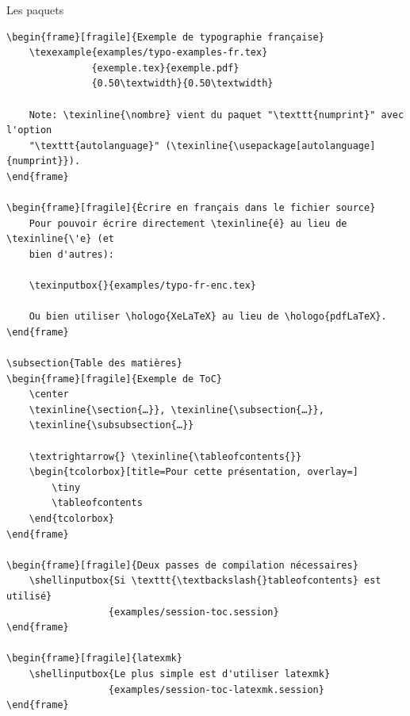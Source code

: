 \documentclass[usenames,dvipsnames]{beamer} %
\newcommand{\texinputbox}[2]{
    \begin{tcolorbox}[title=#1]
        \selectlanguage{english}
        \texinput{#2}
    \end{tcolorbox}
}
\newcommand{\shellinputbox}[2]{
    \begin{tcolorbox}[title=#1,overlay=]
        \selectlanguage{english}
        \shellinput{#2}
    \end{tcolorbox}
}
\newcommand{\texexample}[5]{
    \begin{columns}
        \begin{column}{#4}
            \texinputbox{#2}{#1}
        \end{column}

        \begin{column}{#5}
            \begin{tcolorbox}[title=#3, overlay=]
                
            \end{tcolorbox}
        \end{column}
    \end{columns}
}
\begin{document}
\begin{frame}[fragile]{Les paquets}
\begin{description}
{\begin{verbatim}
\begin{frame}[fragile]{Exemple de typographie française}
    \texexample{examples/typo-examples-fr.tex}
               {exemple.tex}{exemple.pdf}
               {0.50\textwidth}{0.50\textwidth}

    Note: \texinline{\nombre} vient du paquet "\texttt{numprint}" avec l'option
    "\texttt{autolanguage}" (\texinline{\usepackage[autolanguage]{numprint}}).
\end{frame}

\begin{frame}[fragile]{Écrire en français dans le fichier source}
    Pour pouvoir écrire directement \texinline{é} au lieu de \texinline{\'e} (et
    bien d'autres):

    \texinputbox{}{examples/typo-fr-enc.tex}

    Ou bien utiliser \hologo{XeLaTeX} au lieu de \hologo{pdfLaTeX}.
\end{frame}

\subsection{Table des matières}
\begin{frame}[fragile]{Exemple de ToC}
    \center
    \texinline{\section{…}}, \texinline{\subsection{…}},
    \texinline{\subsubsection{…}}

    \textrightarrow{} \texinline{\tableofcontents{}}
    \begin{tcolorbox}[title=Pour cette présentation, overlay=]
        \tiny
        \tableofcontents
    \end{tcolorbox}
\end{frame}

\begin{frame}[fragile]{Deux passes de compilation nécessaires}
    \shellinputbox{Si \texttt{\textbackslash{}tableofcontents} est utilisé}
                  {examples/session-toc.session}
\end{frame}

\begin{frame}[fragile]{latexmk}
    \shellinputbox{Le plus simple est d'utiliser latexmk}
                  {examples/session-toc-latexmk.session}
\end{frame}


\end{verbatim}}
\end{description}
\end{frame}
\end{document}
